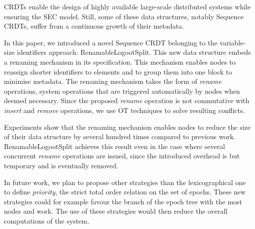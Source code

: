 \documentclass[10pt,journal,compsoc]{IEEEtran}
\begin{document}
\acfp{CRDT} enable the design of highly available large-scale distributed systems while ensuring the \acf{SEC} model.
Still, some of these data structures, notably Sequence \acp{CRDT}, suffer from a continuous growth of their metadata.

In this paper, we introduced a novel Sequence \ac{CRDT} belonging to the variable-size identifiers approach: RenamableLogootSplit.
This new data structure embeds a renaming mechanism in its specification.
This mechanism enables nodes to reassign shorter identifiers to elements and to group them into one block to minimise metadata.
The renaming mechanism takes the form of \emph{rename} operations, system operations that are triggered automatically by nodes when deemed necessary.
Since the proposed \emph{rename} operation is not commutative with \emph{insert} and \emph{remove} operations, we use \ac{OT} techniques to solve resulting conflicts.

Experiments show that the renaming mechanism enables nodes to reduce the size of their data structure by several hundred times compared to previous work.
RenamableLogootSplit achieves this result even in the case where several concurrent \emph{rename} operations are issued, since the introduced overhead is but temporary and is eventually removed.

In future work, we plan to propose other strategies than the lexicographical one to define \emph{priority}, the strict total order relation on the set of epochs.
These new strategies could for example favour the branch of the epoch tree with the most nodes and work.
The use of these strategies would then reduce the overall computations of the system.


%
\end{document}
